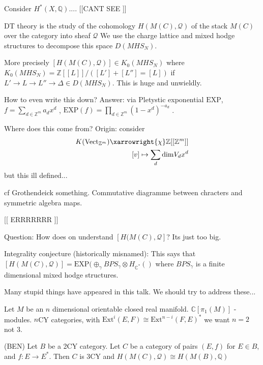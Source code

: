 Consider $ H^* ( X, \mathbb{Q} ) .... $ 
[[CANT SEE ]] 

DT theory is the study of the cohomology $ H( M ( C) , \mathcal{Q}  ) $ of the stack $M( C) $ over the category into sheaf $ \mathcal{Q} $  
We use the charge lattice and mixed hodge structures to decompose this space $D(MHS_N) $.

More precisely $[H(M(C), \mathcal{Q} ) ] \in K_0 (MHS_N) $ where 
$ K_0 ( MHS_N) = \mathbb{Z} [[L]] / ([L'] +[L''] = [L] ) $ if $ L' \rightarrow L \rightarrow L'' \rightarrow \Delta \in D(MHS_N) $. 
This is huge and unwieldly. 

How to even write this down? 
Answer: via Pletystic exponential $\mathrm{EXP} $, 
$f = \sum_{d \in \mathbb{Z} ^m } a_d x^d $ , 
$ \mathrm{EXP} (f) = \prod_{d \in \mathbb{Z} ^m } ( 1 - x^d ) ^{-a_d } $ . 

Where does this come from?
Origin: consider 
\begin{align}
    K ( \mathrm{Vect} _{\mathbb{Z} ^m } ) \xarrowright{\chi} \mathbb{Z} [[\mathbb{Z} ^m ]] \\
    [v] \mapsto \sum _d \mathrm{dim} V_d x^d 
\end{align}
but this ill defined... 

cf Grothendeick something. 
Commutative diagramme between chracters and symmetric algebra maps. 

[[ ERRRRRRR ]]

Question: How does on understand $[ H(M(C), \mathcal{Q} ] $?
Its just too big. 

Integrality conjecture (historically misnamed):
This says that $ [H ( M (C), \mathcal{Q} ) ]  = \mathrm{EXP} ( \oplus_{\gamma} BPS_\gamma \otimes H_{\mathbb{C} ^* }  () $ 
where $ BPS _\gamma $ is a finite dimensional mixed hodge structures. 

Many stupid things have appeared in this talk. 
We should try to address these...

Let $ M $ be an $n$ dimensional orientable closed real manifold. 
$ \mathbb{C} [\pi_1 ( M) ]$ -modules. 
$n$CY categories, with $ \mathrm{Ext}^i (E,F) \cong \mathrm{Ext}^{n-i} ( F, E ) ^* $
we want $ n = 2 $ not $3$. 

\begin{theorem}
    (BEN) 
    Let $B$ be a 2CY category. 
    Let $ C $ be a category of pairs $(E,f)$ for $ E \in B $, and $ f: E \rightarrow E^* $.
    Then $C$ is 3CY  and $H ( M(C) , \mathcal{Q} ) \cong H( M( B) , \mathbb{Q} ) $ 
\end{theorem}


